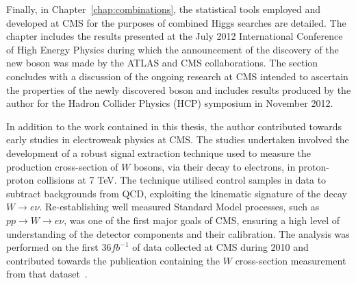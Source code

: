 Finally, in Chapter~\ref{chap:combinations}, the statistical tools employed and developed
at CMS for the purposes of combined Higgs searches are detailed. The chapter includes 
the results presented at the July 2012 International Conference of High Energy Physics during which 
the announcement of the discovery of the new boson was made by the ATLAS and CMS collaborations.
The section concludes with a discussion of the ongoing research at CMS intended to ascertain the properties of 
the newly discovered boson and includes results produced by the author for the Hadron Collider Physics (HCP)
symposium in November 2012.  

In addition to the work contained in this thesis, the author contributed towards early studies
in electroweak physics at CMS. The studies undertaken involved the development of a 
robust signal extraction technique used to measure the production cross-section of $W$ bosons,
via their decay to electrons, in proton-proton collisions at 7 TeV. 
The technique utilised control samples in data to subtract backgrounds from QCD, exploiting the kinematic
signature of the decay $W\rightarrow e\nu$. 
Re-establishing well measured Standard Model processes, such as $pp\rightarrow W\rightarrow e\nu$,
was one of the first major goals of CMS, ensuring a high level of understanding of the detector components
and their calibration. The analysis was performed on the first 36$fb^{-1}$ of 
data collected at CMS during 2010 and contributed towards the publication containing the $W$ cross-section
measurement from that dataset~\citep{EWK-11-001}.  



